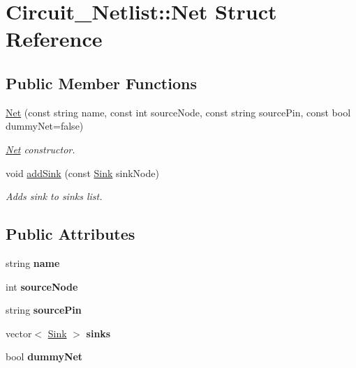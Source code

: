 \hypertarget{structCircuit__Netlist_1_1Net}{\section{Circuit\-\_\-\-Netlist\-:\-:Net Struct Reference}
\label{structCircuit__Netlist_1_1Net}
}
\subsection*{Public Member Functions}
\begin{DoxyCompactItemize}
\item 
\hyperlink{structCircuit__Netlist_1_1Net_acebd510f80cda6c9c480b5e313978895}{Net} (const string name, const int source\-Node, const string source\-Pin, const bool dummy\-Net=false)
\begin{DoxyCompactList}\small\item\em \hyperlink{structCircuit__Netlist_1_1Net}{Net} constructor. \end{DoxyCompactList}\item 
void \hyperlink{structCircuit__Netlist_1_1Net_af5bf832949516e3d7e16957206809027}{add\-Sink} (const \hyperlink{structCircuit__Netlist_1_1Sink}{Sink} sink\-Node)
\begin{DoxyCompactList}\small\item\em Adds sink to sinks list. \end{DoxyCompactList}\end{DoxyCompactItemize}
\subsection*{Public Attributes}
\begin{DoxyCompactItemize}
\item 
\hypertarget{structCircuit__Netlist_1_1Net_aaf85019638c09259b055dc0d1352054a}{string {\bfseries name}}\label{structCircuit__Netlist_1_1Net_aaf85019638c09259b055dc0d1352054a}

\item 
\hypertarget{structCircuit__Netlist_1_1Net_a92ee3950fbcbe247f1d98c180ebb4813}{int {\bfseries source\-Node}}\label{structCircuit__Netlist_1_1Net_a92ee3950fbcbe247f1d98c180ebb4813}

\item 
\hypertarget{structCircuit__Netlist_1_1Net_a44ebd7aa36b2d81b127527a09654f99e}{string {\bfseries source\-Pin}}\label{structCircuit__Netlist_1_1Net_a44ebd7aa36b2d81b127527a09654f99e}

\item 
\hypertarget{structCircuit__Netlist_1_1Net_a99d49ffd915347f780cae8fa9cbbd841}{vector$<$ \hyperlink{structCircuit__Netlist_1_1Sink}{Sink} $>$ {\bfseries sinks}}\label{structCircuit__Netlist_1_1Net_a99d49ffd915347f780cae8fa9cbbd841}

\item 
\hypertarget{structCircuit__Netlist_1_1Net_aad21a10a91330fd07d89ffccf21b55f8}{bool {\bfseries dummy\-Net}}\label{structCircuit__Netlist_1_1Net_aad21a10a91330fd07d89ffccf21b55f8}

\end{DoxyCompactItemize}


